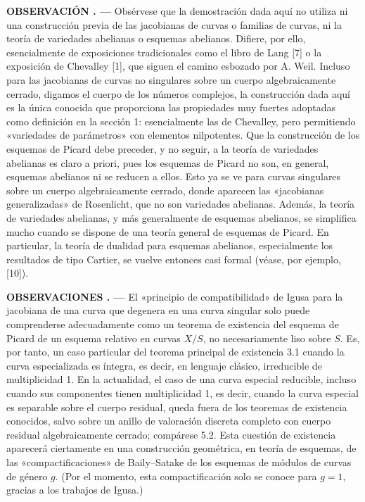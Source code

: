 \documentclass[11pt,twoside,openany]{book}
\numberwithin{equation}{section}
\newcommand{\src}[1]{%
  \phantomsection\hypertarget{src:#1}{}%
  \marginpar{\raggedleft\footnotesize\sffamily #1}%
}
\theoremstyle{plain}
\theoremstyle{definition}
\theoremstyle{remark}
\newcommand{\result}[2]{%
  \par\medskip\noindent\textbf{#1%
  \if\relax\detokenize{#2}\relax\else\space#2\fi. ---}\enspace
}
\newcommand{\FgaUnitKey}{frontmatter}
\renewcommand{\src}[1]{%
  \phantomsection\hypertarget{src:\FgaUnitKey:#1}{}%
  \marginpar{\raggedleft\footnotesize\sffamily #1}%
}
\theoremstyle{plain}
\theoremstyle{definition}
\theoremstyle{remark}
\begin{document}
\result{OBSERVACIÓN}{5.3} Obsérvese que la demostración dada aquí no utiliza ni
una construcción previa de las jacobianas de curvas o familias de curvas, ni la
teoría de variedades abelianas o esquemas abelianos. Difiere, por ello,
esencialmente de exposiciones tradicionales como el libro de Lang [7] o la
exposición de Chevalley [1], que siguen el camino esbozado por A. Weil. Incluso
para las jacobianas de curvas no singulares sobre un cuerpo algebraicamente
cerrado, digamos el cuerpo de los números complejos, la construcción dada aquí
es la única conocida que proporciona las propiedades muy fuertes adoptadas
como definición en la sección 1: esencialmente las de Chevalley, pero permitiendo
«variedades de parámetros» con elementos nilpotentes. Que la construcción de
los esquemas de Picard debe preceder, y no seguir, a la teoría de variedades
abelianas es claro a priori, pues los esquemas de Picard no son, en general,
esquemas abelianos ni se reducen a ellos. Esto ya se ve para curvas singulares
sobre un cuerpo algebraicamente cerrado, donde aparecen las «jacobianas
generalizadas» de Rosenlicht, que no son variedades abelianas. Además, la
teoría de variedades abelianas, y más generalmente de esquemas abelianos, se
simplifica mucho cuando se dispone de una teoría general de esquemas de Picard.
En particular, la teoría de dualidad para esquemas abelianos, especialmente los
resultados de tipo Cartier, se vuelve entonces casi formal (véase, por ejemplo,
[10]).

\src{157}
\result{OBSERVACIONES}{5.4} El «principio de compatibilidad» de Igusa para la
jacobiana de una curva que degenera en una curva singular solo puede
comprenderse adecuadamente como un teorema de existencia del esquema de Picard
de un esquema relativo en curvas $X/S$, no necesariamente liso sobre $S$. Es,
por tanto, un caso particular del teorema principal de existencia 3.1 cuando la
curva especializada es íntegra, es decir, en lenguaje clásico, irreducible de
multiplicidad 1. En la actualidad, el caso de una curva especial reducible,
incluso cuando sus componentes tienen multiplicidad 1, es decir, cuando la
curva especial es separable sobre el cuerpo residual, queda fuera de los
teoremas de existencia conocidos, salvo sobre un anillo de valoración discreta
completo con cuerpo residual algebraicamente cerrado; compárese 5.2. Esta
cuestión de existencia aparecerá ciertamente en una construcción geométrica, en
teoría de esquemas, de las «compactificaciones» de Baily--Satake de los esquemas
de módulos de curvas de género $g$. (Por el momento, esta compactificación solo
se conoce para $g=1$, gracias a los trabajos de Igusa.)
\end{document}
